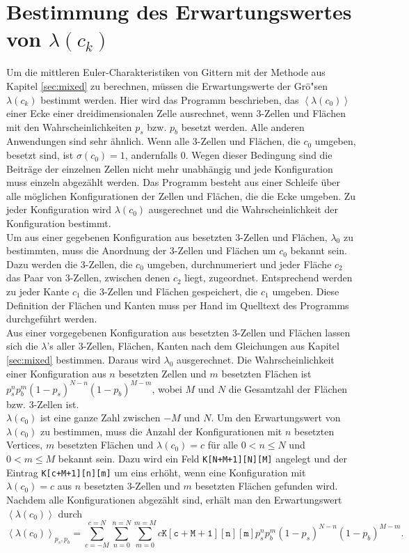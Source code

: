 \section{Bestimmung des Erwartungswertes von $\lambda(c_k)$}
\label{sec:noofcomp}
Um die mittleren Euler-Charakteristiken von Gittern mit der Methode aus Kapitel \ref{sec:mixed} zu berechnen, m\"ussen die Erwartungswerte der Gr\"o"sen $\lambda(c_k)$ bestimmt werden. Hier wird das Programm beschrieben, das $\left<\lambda(c_0)\right>$ einer Ecke einer dreidimensionalen Zelle ausrechnet, wenn $3$-Zellen und Fl\"achen mit den Wahrscheinlichkeiten $p_s$ bzw. $p_b$ besetzt werden. Alle anderen Anwendungen sind sehr \"ahnlich. Wenn alle $3$-Zellen und Fl\"achen, die $c_0$ umgeben, besetzt sind, ist $\sigma(c_0)=1$, andernfalls $0$. Wegen dieser Bedingung sind die Beitr\"age der einzelnen Zellen nicht mehr unabh\"angig und jede Konfiguration muss einzeln abgez\"ahlt werden. Das Programm besteht aus einer Schleife \"uber alle m\"oglichen Konfigurationen der Zellen und Fl\"achen, die die Ecke umgeben. Zu jeder Konfiguration wird $\lambda(c_0)$ ausgerechnet und die Wahrscheinlichkeit der Konfiguration bestimmt. 
\\Um aus einer gegebenen Konfiguration aus besetzten $3$-Zellen und Fl\"achen, $\lambda_0$ zu bestimmten, muss die Anordnung der $3$-Zellen und Fl\"achen um $c_0$ bekannt sein. Dazu werden die $3$-Zellen, die $c_0$ umgeben, durchnumeriert und jeder Fl\"ache $c_2$ das Paar von $3$-Zellen, zwischen denen $c_2$ liegt, zugeordnet. Entsprechend werden zu jeder Kante $c_1$ die $3$-Zellen und Fl\"achen gespeichert, die $c_1$ umgeben. Diese Definition der Fl\"achen und Kanten muss per Hand im Quelltext des Programms durchgef\"uhrt werden. 
\\Aus einer vorgegebenen Konfiguration aus besetzten $3$-Zellen und Fl\"achen lassen sich die $\lambda$'s aller $3$-Zellen, Fl\"achen, Kanten nach dem Gleichungen aus Kapitel \ref{sec:mixed} bestimmen. Daraus wird $\lambda_0$ ausgerechnet. Die Wahrscheinlichkeit einer Konfiguration aus $n$ besetzten Zellen und $m$ besetzten Fl\"achen ist $p_s^{n}p_b^{m}(1-p_s)^{N-n}(1-p_b)^{M-m}$, wobei $M$ und $N$ die Gesamtzahl der Fl\"achen bzw. $3$-Zellen ist.  
\\$\lambda(c_0)$ ist eine ganze Zahl zwischen $-M$ und $N$. Um den Erwartungswert von $\lambda(c_0)$ zu bestimmen, muss die Anzahl der Konfigurationen mit $n$ besetzten Vertices, $m$ besetzten Fl\"achen und $\lambda(c_0)=c$ f\"ur alle $0<n\leq N$ und $0<m\leq M$ bekannt sein. Dazu wird ein Feld \texttt{K[N+M+1][N][M]} angelegt und der Eintrag \texttt{K[c+M+1][n][m]} um eins erh\"oht, wenn eine Konfiguration mit $\lambda(c_0)=c$ aus $n$ besetzten $3$-Zellen und $m$ besetzten Fl\"achen gefunden wird. Nachdem alle Konfigurationen abgez\"ahlt sind, erh\"alt man den Erwartungswert $\left<\lambda(c_0)\right>$ durch
\begin{equation}
  \left<\lambda(c_0)\right>_{p_s,p_b}=\sum_{c=-M}^{c=N}\sum_{n=0}^{n=N}\sum_{m=0}^{m=M}c\mathtt{K[c+M+1][n][m]}p_s^np_b^m(1-p_s)^{N-n}(1-p_b)^{M-m}.
\end{equation}